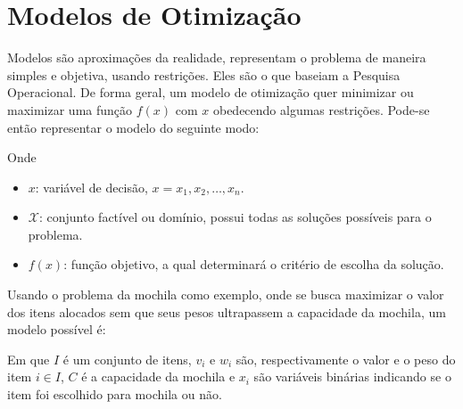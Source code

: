 \section{Modelos de Otimização}\label{sec:modelos-de-otimizacao}

Modelos são aproximações da realidade, representam o problema de maneira simples e objetiva,
usando restrições.
Eles são o que baseiam a Pesquisa Operacional.
De forma geral, um modelo de otimização quer minimizar ou maximizar uma função $f(x)$ com $x$
obedecendo algumas restrições.
Pode-se então representar o modelo do seguinte modo:



Onde

\begin{itemize}
    \item $x$: variável de decisão, $x = x_1, x_2, \dots, x_n$.
    \item $\mathcal{X}$: conjunto factível ou domínio, possui todas as soluções possíveis para o problema.
    \item $f(x)$: função objetivo, a qual determinará o critério de escolha da solução.
\end{itemize}

Usando o problema da mochila como exemplo, onde se busca maximizar o valor dos itens alocados
sem que seus pesos ultrapassem a capacidade da mochila,
um modelo possível é:



Em que $I$ é um conjunto de itens, $v_{i}$ e $w_{i}$ são, respectivamente o valor e o peso do item
$i \in I$, $C$ é a capacidade da mochila e $x_{i}$ são variáveis binárias indicando se o
item foi escolhido para mochila ou não.
